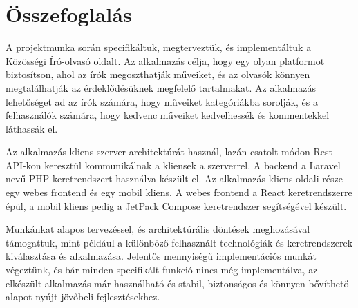 \section{Összefoglalás}
\label{sec:summary}

A projektmunka során specifikáltuk, megterveztük, és implementáltuk a Közösségi Író-olvasó oldalt. Az alkalmazás célja, hogy egy olyan platformot biztosítson, ahol az írók megoszthatják műveiket, és az olvasók könnyen megtalálhatják az érdeklődésüknek megfelelő tartalmakat. Az alkalmazás lehetőséget ad az írók számára, hogy műveiket kategóriákba sorolják, és a felhasználók számára, hogy kedvenc műveiket kedvelhessék és kommentekkel láthassák el.

Az alkalmazás kliens-szerver architektúrát használ, lazán csatolt módon Rest API-kon keresztül kommunikálnak a kliensek a szerverrel. A backend a Laravel nevű PHP keretrendszert használva készült el. Az alkalmazás kliens oldali része egy webes frontend és egy mobil kliens. A webes frontend a React keretrendszerre épül, a mobil kliens pedig a JetPack Compose keretrendszer segítségével készült. 

Munkánkat alapos tervezéssel, és architektúrális döntések meghozásával támogattuk, mint például a különböző felhasznált technológiák és keretrendszerek kiválasztása és alkalmazása. Jelentős mennyiségű implementációs munkát végeztünk, és bár minden specifikált funkció nincs még implementálva, az elkészült alkalmazás már használható és stabil, biztonságos és könnyen bővíthető alapot nyújt jövőbeli fejlesztésekhez.